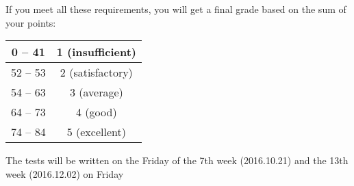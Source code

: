 \documentclass{article}
\begin{document}
If you meet all these requirements, you will get a final grade based on the sum of your points:

\begin{center}
\begin{tabular}{|c|c|}
\hline
0 -- 41 & 1 (insufficient) \\
\hline
52 -- 53 & 2 (satisfactory) \\
\hline
54 -- 63 & 3 (average) \\
\hline
64 -- 73 & 4 (good) \\
\hline
74 -- 84 & 5 (excellent) \\
\hline
\end{tabular}
\end{center}

The tests will be written on the Friday of the 7th week (2016.10.21) and the 13th week (2016.12.02) on Friday
\end{document}
